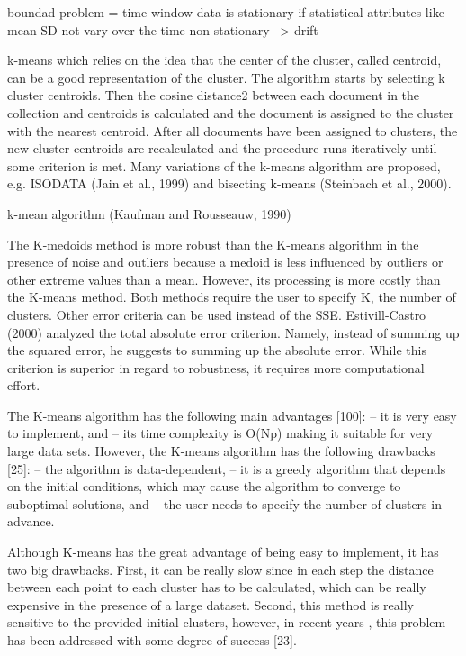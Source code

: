 boundad problem = time window
data is stationary if statistical attributes like mean SD not vary over the time
non-stationary --> drift

k-means 
which relies on the idea that the center of the cluster, called centroid, can be a good representation of the cluster. The algorithm starts by selecting k cluster centroids. Then the cosine distance2 between each document in the collection and  
centroids is calculated and the document is assigned to the cluster with the
nearest centroid. After all documents have been assigned to clusters, the new cluster centroids are recalculated and the procedure runs iteratively until some
criterion is met. Many variations of the k-means algorithm are proposed, e.g. ISODATA (Jain et al., 1999) and bisecting k-means (Steinbach et al., 2000). 

k-mean algorithm (Kaufman and Rousseauw, 1990)

The K-medoids method is more robust than the K-means algorithm in the
presence of noise and outliers because a medoid is less influenced by outliers
or other extreme values than a mean. However, its processing is more costly
than the K-means method. Both methods require the user to specify K, the
number of clusters.
Other error criteria can be used instead of the SSE. Estivill-Castro (2000)
analyzed the total absolute error criterion. Namely, instead of summing up
the squared error, he suggests to summing up the absolute error. While this
criterion is superior in regard to robustness, it requires more computational
effort.

The K-means algorithm has the following main advantages [100]:
– it is very easy to implement, and
– its time complexity is O(Np) making it suitable for very large data sets.
However, the K-means algorithm has the following drawbacks [25]:
– the algorithm is data-dependent,
– it is a greedy algorithm that depends on the initial conditions, which may cause the algorithm to
converge to suboptimal solutions, and
– the user needs to specify the number of clusters in advance.

Although K-means has the great advantage of being easy to implement,
it has two big drawbacks. First, it can be really slow since in each step the
distance between each point to each cluster has to be calculated, which can
be really expensive in the presence of a large dataset. Second, this method
is really sensitive to the provided initial clusters, however, in recent years ,
this problem has been addressed with some degree of success [23].


